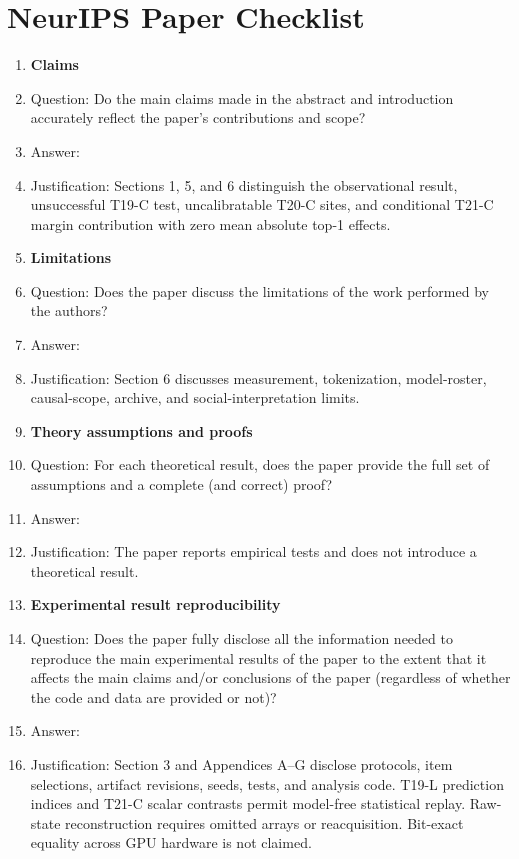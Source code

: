 \section*{NeurIPS Paper Checklist}

\begin{enumerate}

\item {\bf Claims}
  \item[] Question: Do the main claims made in the abstract and introduction accurately reflect the paper's contributions and scope?
  \item[] Answer: \answerYes{}
  \item[] Justification: Sections 1, 5, and 6 distinguish the observational result, unsuccessful T19-C test, uncalibratable T20-C sites, and conditional T21-C margin contribution with zero mean absolute top-1 effects.

\item {\bf Limitations}
  \item[] Question: Does the paper discuss the limitations of the work performed by the authors?
  \item[] Answer: \answerYes{}
  \item[] Justification: Section 6 discusses measurement, tokenization, model-roster, causal-scope, archive, and social-interpretation limits.

\item {\bf Theory assumptions and proofs}
  \item[] Question: For each theoretical result, does the paper provide the full set of assumptions and a complete (and correct) proof?
  \item[] Answer: \answerNA{}
  \item[] Justification: The paper reports empirical tests and does not introduce a theoretical result.

\item {\bf Experimental result reproducibility}
  \item[] Question: Does the paper fully disclose all the information needed to reproduce the main experimental results of the paper to the extent that it affects the main claims and/or conclusions of the paper (regardless of whether the code and data are provided or not)?
  \item[] Answer: \answerYes{}
  \item[] Justification: Section 3 and Appendices A--G disclose protocols, item selections, artifact revisions, seeds, tests, and analysis code. T19-L prediction indices and T21-C scalar contrasts permit model-free statistical replay. Raw-state reconstruction requires omitted arrays or reacquisition. Bit-exact equality across GPU hardware is not claimed.


\end{enumerate}
